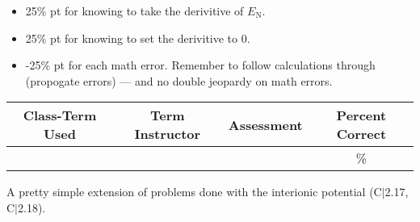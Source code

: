 \begin{rubric}

\begin{itemize}
	\item 25\% pt for knowing to take the derivitive of $E_{\text{N}}$.
	\item 25\% pt for knowing to set the derivitive to 0.
	\item -25\% pt for each math error. Remember to follow calculations through (propogate errors) --- and no double jeopardy on math errors.
\end{itemize}

\end{rubric}

\begin{outcomes}
	\begin{center}
		\begin{tabular}{cccc}
			\hline\hline
			Class-Term Used & Term Instructor & Assessment & Percent Correct\\
			\hline
			 &  &  & \%\\    %
			\hline
		\end{tabular}
	\end{center}
\end{outcomes}

\begin{comments}

A pretty simple extension of problems done with the interionic potential (C$|$2.17, C$|$2.18).
	
\end{comments}
